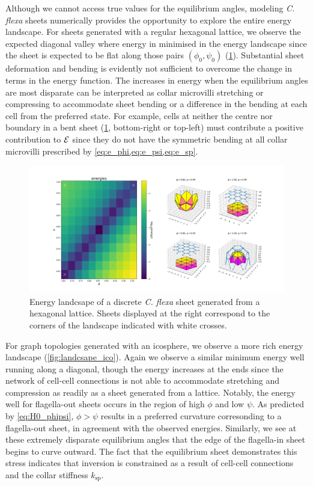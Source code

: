 Although we cannot access true values for the equilibrium angles, modeling \textit{C. flexa} sheets numerically provides the opportunity to explore the entire energy landscape. 
For sheets generated with a regular hexagonal lattice, we observe the expected diagonal valley where energy in minimised in the energy landscape since the sheet is expected to be flat along those pairs $(\phi_0, \psi_0)$ (\cref{fig:landscape_flat}).
Substantial sheet deformation and bending is evidently not sufficient to overcome the change in terms in the energy function. 
The increases in energy when the equilibrium angles are most disparate can be interpreted as collar microvilli stretching or compressing to accommodate sheet bending or a difference in the bending at each cell from the preferred state. 
For example, cells at neither the centre nor boundary in a bent sheet (\cref{fig:landscape_flat}, bottom-right or top-left) must contribute a positive contribution to $\mathcal{E}$ since they do not have the symmetric bending at all collar microvilli prescribed by \cref{eq:e_phi,eq:e_psi,eq:e_sp}.

\begin{figure}
	\centering
	\includegraphics[width=\textwidth]{landscape_flat.png}
	\caption[Energy landscape of a discrete \textit{C. flexa} sheet generated from a hexagonal lattice]{Energy landcsape of a discrete \textit{C. flexa} sheet generated from a hexagonal lattice. Sheets displayed at the right correspond to the corners of the landscape indicated with white crosses.}
	\label{fig:landscape_flat}
\end{figure}

For graph topologies generated with an icosphere, we observe a more rich energy landscape (\cref{fig:landcsape_ico}).
Again we observe a similar minimum energy well running along a diagonal, though the energy increases at the ends since the network of cell-cell connections is not able to accommodate stretching and compression as readily as a sheet generated from a lattice.
Notably, the energy well for flagella-out sheets occurs in the region of high $\phi$ and low $\psi$. 
As predicted by \cref{eq:H0_phipsi}, $\phi > \psi$ results in a preferred curvature corresonding to a flagella-out sheet, in agreement with the observed energies.
Similarly, we see at these extremely disparate equilibrium angles that the edge of the flagella-in sheet begins to curve outward.
The fact that the equilibrium sheet demonstrates this stress indicates that inversion is constrained as a result of cell-cell connections and the collar stiffness $k_{\text{sp}}$.

